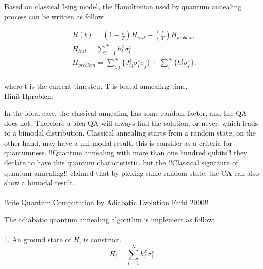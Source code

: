 \documentclass[twoside,a4paper,article]{combine}
\begin{document}
Based on classical Ising model, the Hamiltonian used by quantum annealing process can be written as follow

\begin{equation}
\begin{split}
&H(t)=(1-\frac{t}{T} )H_{init}+(\frac{t}{T})H_{problem} \\
&H_{init}= \sum_{i=1}^{N}h_i^x \sigma_i^x\\
&H_{problem}= \sum_{i,j}^N \{J_{ij}^z \sigma^z_i \sigma^z_j \}+ \sum_{i}^N \{h_i^z \sigma^z_i\},\\
\end{split}
\end{equation} 

where t is the current timestep, T is toatal annealing time,\\
Hinit
Hproblem




In the ideal case, the classical annealing has some random factor, and the QA does not. Therefore a idea QA will always find the solution, or never, which leads to a bimodal distribution. Classical annealing starts from a random state, on the other hand, may have a uni-modal result. this is consider as a criteria for quantumness. !!Quantum annealing with more than one hundred qubits!! they declare to have this quantum characteristic. but the !!Classical signature of quantum annealing!! claimed that by picking same random state, the CA can also show a bimodal result. \\
\\

!!cite Quantum Computation by Adiabatic Evolution Farhi 2000!!

The adiabatic quantum annealing algorithm is implement as follow:\\
\\
1. An ground state of $H_i$ is construct.
\begin{equation*}
	H_i=\sum_{i=1}^{N}h_i^x \sigma_i^x
\end{equation*}   
\end{document}
